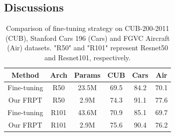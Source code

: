 \documentclass[letterpaper]{article} %
\begin{document}

\subsection{Discussions}



\begin{table}\centering

	\begin{tabular}{c|c|c||c|c|c}
		\hline
       \hline
       Method & Arch & Params & CUB & Cars & Air \\


		\hline
		\hline
		Fine-tuning & R50 & 23.5M & 69.5 & 84.2 & 70.1 \\
		Our FRPT  & R50 & 2.9M &74.3 & 91.1& 77.6\\
		Fine-tuning & R101 & 43.6M & 70.9 & 85.1 & 69.7 \\
		Our FRPT  & R101 & 2.9M &75.6 & 90.4& 76.2\\
		\hline
		\hline

\end{tabular}
	\caption{ Comparison of fine-tuning strategy on CUB-200-2011 (CUB),  Stanford Cars 196 (Cars) and FGVC Aircraft (Air) datasets.  "R50" and "R101" represent Resnet50 and Resnet101\cite{He2015Deep}, respectively. %
} 
\end{table}
\end{document}
